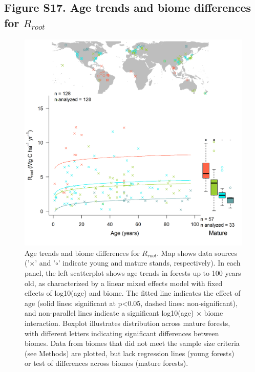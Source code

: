 \documentclass[
]{article}
\begin{document}
\newpage

\hypertarget{figure-s17.-age-trends-and-biome-differences-for-r_root}{%
\subsection{\texorpdfstring{Figure S17. Age trends and biome differences
for
\(R_{root}\)}{Figure S17. Age trends and biome differences for R\_\{root\}}}\label{figure-s17.-age-trends-and-biome-differences-for-r_root}}

\begin{figure}[H]

{\centering \includegraphics[width=1\linewidth]{tables_figures/age_trends/R_root_with_map} 

}

\caption{Age trends and biome differences for $R_{root}$. Map shows data sources ('$\times$' and '$\circ$' indicate young and mature stands, respectively). In each panel, the left scatterplot shows age trends in forests up to 100 years old, as characterized by a linear mixed effects model with fixed effects of log10(age) and biome. The fitted line indicates the effect of age (solid lines: significant at p<0.05, dashed lines: non-significant), and non-parallel lines indicate a significant log10(age) $\times$ biome interaction. Boxplot illustrates distribution across mature forests, with different letters indicating significant differences between biomes. Data from biomes that did not meet the sample size criteria (see Methods) are plotted, but lack regression lines (young forests) or test of differences across biomes (mature forests).}\label{fig:unnamed-chunk-20}
\end{figure}
\end{document}
